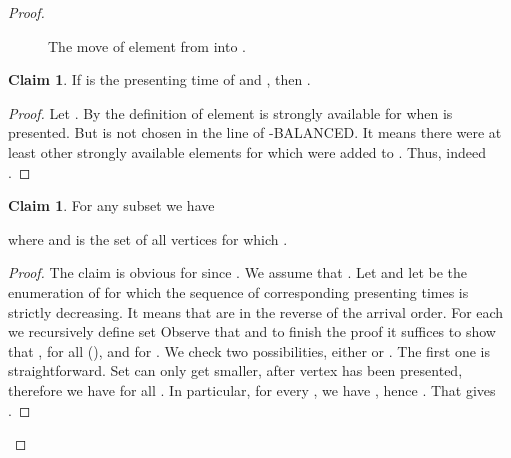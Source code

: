 \documentclass[12pt]{amsart}
\theoremstyle{definition}
\newtheorem{claim}[theorem]{Claim}
\newcommand{\Alg}[0]{\textsf{BALANCED}\xspace}
\begin{document}
\begin{proof}
\begin{figure}
\begin{center}
\caption{The move of element  from  into .}
\label{fig:common-element}
\end{center}
\end{figure}


\begin{claim}\label{claim:els-above-X}
 If  is the presenting time of  and , then .
\end{claim}
\begin{proof}
 Let . By the definition of  element  is strongly available for  when  is presented. 
But  is not chosen in the line  of -\Alg{}. 
It means there were at least  other strongly available elements for  which were added to . 
Thus, indeed .
\end{proof}



\begin{claim}\label{claim:main-ineq}
For any subset   we have

where  and  is the set of all vertices  for which . 
\end{claim}
\begin{proof}
The claim is obvious for  since .
We assume that .
Let  and let  be the enumeration of  for which the sequence of corresponding presenting times  is strictly decreasing.
It means that  are in the reverse of the arrival order.
For each  we recursively define  set  
Observe that  and to finish the proof it suffices to show that , for all  (), and  for . We check two possibilities, either  or .
The first one is straightforward.
Set  can only get smaller, after  vertex  has been presented, therefore we have  for all . 
In particular, for every , we have , hence . That gives .



\end{proof}
\end{proof}
\end{document}
